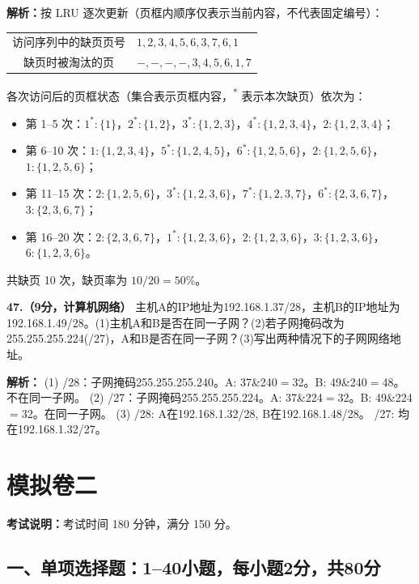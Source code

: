 \ifshowsolutions\par\noindent\textbf{解析：}按 LRU 逐次更新（页框内顺序仅表示当前内容，不代表固定编号）：
\begin{center}
\begin{tabular}{c|l}
访问序列中的缺页页号 & $1,2,3,4,5,6,3,7,6,1$\\
缺页时被淘汰的页 & $-, -, -, -, 3,4,5,6,1,7$
\end{tabular}
\end{center}
各次访问后的页框状态（集合表示页框内容，\textsuperscript{*} 表示本次缺页）依次为：
\begin{itemize}
    \item 第 1--5 次：$1^*:\{1\}$，$2^*:\{1,2\}$，$3^*:\{1,2,3\}$，$4^*:\{1,2,3,4\}$，$2:\{1,2,3,4\}$；
    \item 第 6--10 次：$1:\{1,2,3,4\}$，$5^*:\{1,2,4,5\}$，$6^*:\{1,2,5,6\}$，$2:\{1,2,5,6\}$，$1:\{1,2,5,6\}$；
    \item 第 11--15 次：$2:\{1,2,5,6\}$，$3^*:\{1,2,3,6\}$，$7^*:\{1,2,3,7\}$，$6^*:\{2,3,6,7\}$，$3:\{2,3,6,7\}$；
    \item 第 16--20 次：$2:\{2,3,6,7\}$，$1^*:\{1,2,3,6\}$，$2:\{1,2,3,6\}$，$3:\{1,2,3,6\}$，$6:\{1,2,3,6\}$。
\end{itemize}
共缺页 10 次，缺页率为 $10/20=50\%$。\else \answerarea[8] \fi

\vspace{8pt}

\noindent\textbf{47.（9分，计算机网络）} 主机A的IP地址为192.168.1.37/28，主机B的IP地址为192.168.1.49/28。(1)主机A和B是否在同一子网？(2)若子网掩码改为255.255.255.224(/27)，A和B是否在同一子网？(3)写出两种情况下的子网网络地址。

\ifshowsolutions\par\noindent\textbf{解析：}
(1) /28：子网掩码255.255.255.240。A: 37\&240$=$32。B: 49\&240$=$48。不在同一子网。
(2) /27：子网掩码255.255.255.224。A: 37\&224$=$32。B: 49\&224$=$32。在同一子网。
(3) /28: A在192.168.1.32/28, B在192.168.1.48/28。 /27: 均在192.168.1.32/27。\else \answerarea[8] \fi

\newpage
\section{模拟卷二}

\noindent\textbf{考试说明：}考试时间 180 分钟，满分 150 分。

\subsection*{一、单项选择题：1--40小题，每小题2分，共80分}

